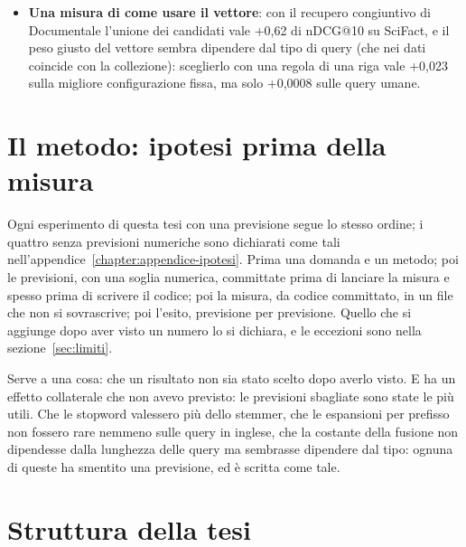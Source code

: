\begin{itemize}
        vuoto il 30\% delle ricerche contro il 46\%. Con le stesse correzioni anche
        Elasticsearch arriva a 0,449, e su 104 ricerche per contenuto i due non si
        distinguono: il vantaggio è compatibile con stare nelle impostazioni,
        non nel motore. Dall'app, il profilo che tiene insieme le ricerche per
        contenuto e quelle per numero, con il recupero congiuntivo e i vettori,
        fa 0,607 e 0,956; lo stesso motore fuori dall'app, in recupero
        disgiuntivo e con i vettori, arriva a 0,613
        (capitolo~\ref{chapter:confronto}).
  \item \textbf{Una misura di come usare il vettore}: con il recupero
        congiuntivo di Documentale l'unione dei candidati vale +0,62 di nDCG@10
        su SciFact, e il peso giusto del vettore sembra dipendere dal tipo di query
        (che nei dati coincide con la collezione): sceglierlo con una regola
        di una riga vale +0,023 sulla migliore configurazione fissa, ma solo
        +0,0008 sulle query umane.
\end{itemize}

\section{Il metodo: ipotesi prima della misura}\label{sec:metodo}

Ogni esperimento di questa tesi con una previsione segue lo stesso ordine; i
quattro senza previsioni numeriche sono dichiarati come tali
nell'appendice~\ref{chapter:appendice-ipotesi}. Prima una domanda e un
metodo; poi le previsioni, con una soglia numerica, committate prima di lanciare
la misura e spesso prima di scrivere il codice; poi la misura, da codice
committato, in un file che non si sovrascrive; poi l'esito, previsione per
previsione. Quello che si aggiunge dopo aver visto un numero lo si dichiara, e le eccezioni
sono nella sezione~\ref{sec:limiti}.

Serve a una cosa: che un risultato non sia stato scelto dopo averlo visto. E ha un
effetto collaterale che non avevo previsto: le previsioni sbagliate sono state le
più utili. Che le stopword valessero più dello stemmer, che le espansioni per
prefisso non fossero rare nemmeno sulle query in inglese, che la costante della
fusione non dipendesse dalla lunghezza delle query ma sembrasse dipendere dal tipo: ognuna di queste
ha smentito una previsione, ed è scritta come tale.

\section{Struttura della tesi}\label{sec:struttura}

